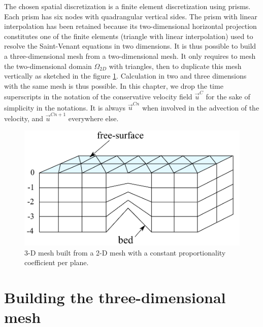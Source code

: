 The chosen spatial discretization is a finite element discretization using
prisms. Each prism has six nodes with quadrangular
vertical sides. The prism with linear interpolation has been retained because its two-dimensional
horizontal projection constitutes one of the finite elements (triangle with
linear interpolation) used to resolve the Saint-Venant equations in two
dimensions. It is thus possible to build a three-dimensional mesh from a
two-dimensional mesh. It only requires to mesh the two-dimensional domain
$\Omega_{2D}$ with triangles, then to duplicate this mesh vertically as
sketched in the figure \ref{maillage 3D 1}.
Calculation in two and three dimensions with the same mesh is thus possible.
In this chapter, we drop the time superscripts in the notation of the
conservative velocity field $\vec{u}^C$ for the sake of simplicity in the notations.
It is always $\vec{u}^{Cn}$ when involved in the advection of the velocity,
and $\vec{u}^{Cn+1}$ everywhere else.

\begin{figure}[tbh]%
\centering
\includegraphics[scale=0.5]{graphics/classical_mesh.pdf}%
\caption{3-D mesh built from a 2-D mesh with a constant proportionality coefficient per plane.}%
\label{maillage 3D 1}%
\end{figure}


\section{\label{maillage 3D}Building the three-dimensional mesh}

